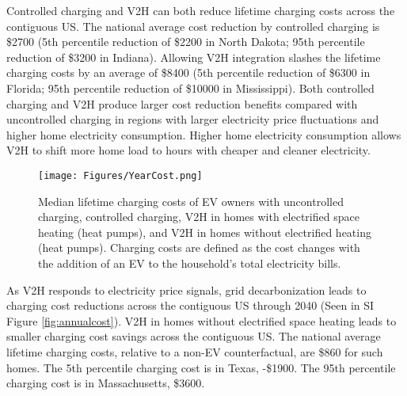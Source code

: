 \documentclass[11pt,preprint]{elsarticle}
\begin{document}
Controlled charging and V2H can both reduce lifetime charging costs across the contiguous US. The national average cost reduction by controlled charging is \$2700 (5th percentile reduction of \$2200 in North Dakota; 95th percentile reduction of \$3200 in Indiana). Allowing V2H integration slashes the lifetime charging costs by an average of \$8400 (5th percentile reduction of \$6300 in Florida; 95th percentile reduction of \$10000 in Mississippi). Both controlled charging and V2H produce larger cost reduction benefits compared with uncontrolled charging in regions with larger electricity price fluctuations and higher home electricity consumption. Higher home electricity consumption allows V2H to shift more home load to hours with cheaper and cleaner electricity.

\begin{figure*}[!ht]
    \centering
    \texttt{[image: Figures/YearCost.png]}
    \caption{Median lifetime charging costs of EV owners with uncontrolled charging, controlled charging, V2H in homes with electrified space heating (heat pumps), and V2H in homes without electrified heating (heat pumps). Charging costs are defined as the cost changes with the addition of an EV to the household's total electricity bills. }
    \label{fig:lifetimecosts}
\end{figure*}


As V2H responds to electricity price signals, grid decarbonization leads to charging cost reductions across the contiguous US through 2040 (Seen in SI Figure \ref{fig:annualcost}). V2H in homes without electrified space heating leads to smaller charging cost savings across the contiguous US. The national average lifetime charging costs, relative to a non-EV counterfactual, are \$860 for such homes. The 5th percentile charging cost is in Texas, -\$1900. The 95th percentile charging cost is in Massachusetts, \$3600. 
\end{document}
